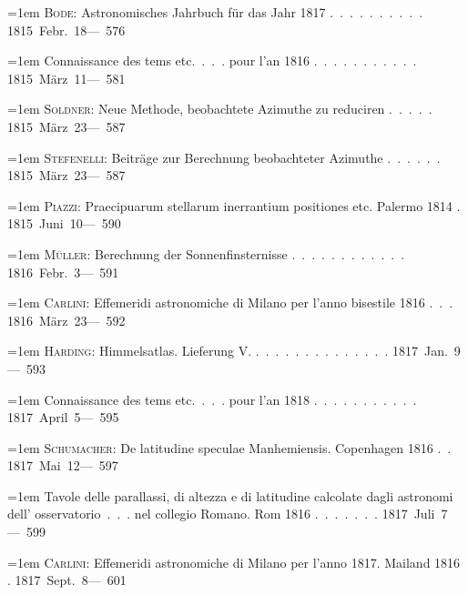 \noindent\hangindent=1em \textsc{Bode}: Astronomisches Jahrbuch für das Jahr 1817 \mbox{.\ .\ .\ .\ .\ .\ .\ .\ .\ .} \hfill\mbox{1815 Febr. 18}\quad\mbox{--- 576}\par\smallskip
\noindent\hangindent=1em Connaissance des tems etc.\ .\ .\ . pour l'an 1816 \mbox{.\ .\ .\ .\ .\ .\ .\ .\ .\ .\ .} \hfill\mbox{1815 März 11}\quad\mbox{--- 581}\par\smallskip
\noindent\hangindent=1em \textsc{Soldner}: Neue Methode, beobachtete Azimuthe zu reduciren \mbox{.\ .\ .\ .\ .} \hfill\mbox{1815 März 23}\quad\mbox{--- 587}\par\smallskip
\noindent\hangindent=1em \textsc{Stefenelli}: Beiträge zur Berechnung beobachteter Azimuthe \mbox{.\ .\ .\ .\ .\ .} \hfill\mbox{1815 März 23}\quad\mbox{--- 587}\par\smallskip
\noindent\hangindent=1em \textsc{Piazzi}: Praecipuarum stellarum inerrantium positiones etc. Palermo 1814 \mbox{.} \hfill\mbox{1815 Juni 10}\quad\mbox{--- 590}\par\smallskip
\noindent\hangindent=1em \textsc{Müller}: Berechnung der Sonnenfinsternisse \mbox{.\ .\ .\ .\ .\ .\ .\ .\ .\ .\ .\ .} \hfill\mbox{1816 Febr. 3}\quad\mbox{--- 591}\par\smallskip
\noindent\hangindent=1em \textsc{Carlini}: Effemeridi astronomiche di Milano per l'anno bisestile 1816 \mbox{.\ .\ .} \hfill\mbox{1816 März 23}\quad\mbox{--- 592}\par\smallskip
\noindent\hangindent=1em \textsc{Harding}: Himmelsatlas. Lieferung V. \mbox{.\ .\ .\ .\ .\ .\ .\ .\ .\ .\ .\ .\ .\ .} \hfill\mbox{1817 Jan. 9}\quad\mbox{--- 593}\par\smallskip
\noindent\hangindent=1em Connaissance des tems etc.\ .\ .\ . pour l'an 1818 \mbox{.\ .\ .\ .\ .\ .\ .\ .\ .\ .\ .} \hfill\mbox{1817 April 5}\quad\mbox{--- 595}\par\smallskip
\noindent\hangindent=1em \textsc{Schumacher}: De latitudine speculae Manhemiensis. Copenhagen 1816 \mbox{.\ .} \hfill\mbox{1817 Mai 12}\quad\mbox{--- 597}\par\smallskip
\noindent\hangindent=1em Tavole delle parallassi, di altezza e di latitudine calcolate dagli astronomi dell' osservatorio\ .\ .\ . nel collegio Romano. Rom 1816 \mbox{.\ .\ .\ .\ .\ .\ .} \hfill\mbox{1817 Juli 7}\quad\mbox{--- 599}\par\smallskip
\noindent\hangindent=1em \textsc{Carlini}: Effemeridi astronomiche di Milano per l'anno 1817. Mailand 1816 \mbox{.} \hfill\mbox{1817 Sept. 8}\quad\mbox{---\textperiodcentered{} 601}\par\smallskip
\endgroup
